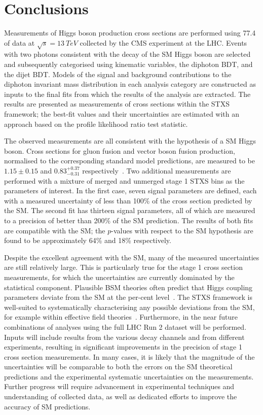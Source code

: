 \chapter{Conclusions}
\label{chap:conclusions}

Measurements of Higgs boson production cross sections are performed using \SI{77.4}{\fbinv} of 
data at $\sqrt{s} = \SI{13}{TeV}$ collected by the CMS experiment at the LHC.
Events with two photons consistent with the decay of the SM Higgs boson are selected
and subsequently categorised using kinematic variables, the diphoton BDT, and the dijet BDT.
Models of the signal and background contributions to the diphoton invariant mass distribution 
in each analysis category are constructed as inputs to the final fits 
from which the results of the analysis are extracted.
The results are presented as measurements of cross sections within the STXS framework;
the best-fit values and their uncertainties are estimated with an approach 
based on the profile likelihood ratio test statistic.

The observed measurements are all consistent with the hypothesis of a SM Higgs boson.
Cross sections for gluon fusion and vector boson fusion production, 
normalised to the corresponding standard model predictions,
are measured to be $1.15 \pm 0.15$ and $0.83_{-0.31}^{+0.37}$ respectively~\cite{HIG-18-029}.
Two additional measurements are performed with a mixture of merged and unmerged 
stage 1 STXS bins as the parameters of interest.
In the first case, seven signal parameters are defined, 
each with a measured uncertainty of less than 100\% of the cross section predicted by the SM.
The second fit has thirteen signal parameters, all of which are measured to a precision 
of better than 200\% of the SM prediction.
The results of both fits are compatible with the SM; the $p$-values with respect to the SM hypothesis
are found to be approximately 64\% and 18\% respectively.

Despite the excellent agreement with the SM, 
many of the measured uncertainties are still relatively large.
This is particularly true for the stage 1 cross section measurements, 
for which the uncertainties are currently dominated by the statistical component.
Plausible BSM theories often predict that Higgs coupling parameters 
deviate from the SM at the per-cent level~\cite{Snowmass}.
The STXS framework is well-suited to systematically characterising 
any possible deviations from the SM, for example within effective field theories~\cite{STXStoEFT}.
Furthermore, 
in the near future combinations of analyses using the full LHC Run 2 dataset will be performed.
Inputs will include results from the various decay channels and from different experiments, 
resulting in significant improvements in the precision of stage 1 cross section measurements.
In many cases, it is likely that the magnitude of the uncertainties will be comparable to both 
the errors on the SM theoretical predictions 
and the experimental systematic uncertainties on the measurements.
Further progress will require advancement in experimental techniques 
and understanding of collected data, 
as well as dedicated efforts to improve the accuracy of SM predictions.

